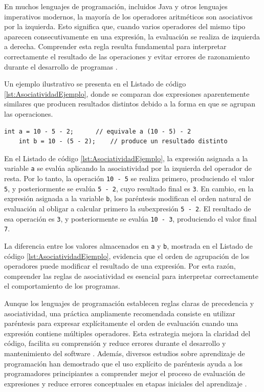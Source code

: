 \documentclass[12pt,twoside]{book}
\begin{document}
						En muchos lenguajes de programación, incluidos Java y otros lenguajes imperativos modernos, la mayoría de los operadores aritméticos son asociativos por la izquierda. Esto significa que, cuando varios operadores del mismo tipo aparecen consecutivamente en una expresión, la evaluación se realiza de izquierda a derecha. Comprender esta regla resulta fundamental para interpretar correctamente el resultado de las operaciones y evitar errores de razonamiento durante el desarrollo de programas \cite{Sebesta2018Concepts}.
						
						Un ejemplo ilustrativo se presenta en el Listado de código \ref{lst:AsociatividadEjemplo}, donde se comparan dos expresiones aparentemente similares que producen resultados distintos debido a la forma en que se agrupan las operaciones.
						
						\begin{lstlisting}[style=Java,caption={Evaluación de expresiones considerando la asociatividad de operadores.},label={lst:AsociatividadEjemplo}]
	int a = 10 - 5 - 2;      // equivale a (10 - 5) - 2
	int b = 10 - (5 - 2);    // produce un resultado distinto \end{lstlisting}
						
						\noindent
						En el Listado de código \ref{lst:AsociatividadEjemplo}, la expresión asignada a la variable \texttt{a} se evalúa aplicando la asociatividad por la izquierda del operador de resta. Por lo tanto, la operación \texttt{10 - 5} se realiza primero, produciendo el valor \texttt{5}, y posteriormente se evalúa \texttt{5 - 2}, cuyo resultado final es \texttt{3}. En cambio, en la expresión asignada a la variable \texttt{b}, los paréntesis modifican el orden natural de evaluación al obligar a calcular primero la subexpresión \texttt{5 - 2}. El resultado de esa operación es \texttt{3}, y posteriormente se evalúa \texttt{10 - 3}, produciendo el valor final \texttt{7}.
						
						La diferencia entre los valores almacenados en \texttt{a} y \texttt{b}, mostrada en el Listado de código \ref{lst:AsociatividadEjemplo}, evidencia que el orden de agrupación de los operadores puede modificar el resultado de una expresión. Por esta razón, comprender las reglas de asociatividad es esencial para interpretar correctamente el comportamiento de los programas.
						
						Aunque los lenguajes de programación establecen reglas claras de precedencia y asociatividad, una práctica ampliamente recomendada consiste en utilizar paréntesis para expresar explícitamente el orden de evaluación cuando una expresión contiene múltiples operadores. Esta estrategia mejora la claridad del código, facilita su comprensión y reduce errores durante el desarrollo y mantenimiento del software \cite{Pressman2019Software,Sommerville2015Software}. Además, diversos estudios sobre aprendizaje de programación han demostrado que el uso explícito de paréntesis ayuda a los programadores principiantes a comprender mejor el proceso de evaluación de expresiones y reduce errores conceptuales en etapas iniciales del aprendizaje \cite{Qian2018Students,Robins2003Learning,Lister2004Learning}.
						
\end{document}
